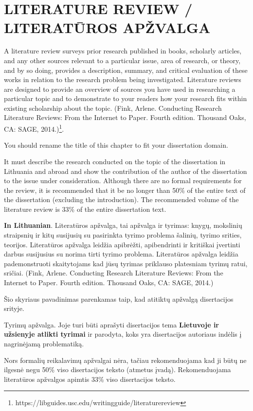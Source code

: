 
\setcounter{chapter}{0}

\chapter{\MakeUppercase{Literature review / Literatūros apžvalga}} %
\label{cha:review}


A literature review surveys prior research published in books, scholarly articles, and any other sources relevant to a particular issue, area of research, or theory, and by so doing, provides a description, summary, and critical evaluation of these works in relation to the research problem being investigated. Literature reviews are designed to provide an overview of sources you have used in researching a particular topic and to demonstrate to your readers how your research fits within existing scholarship about the topic.  (Fink, Arlene. Conducting Research Literature Reviews: From the Internet to Paper. Fourth edition. Thousand Oaks, CA: SAGE, 2014.)\footnote{https://libguides.usc.edu/writingguide/literaturereview}. 

You should rename the title of this chapter to fit your dissertation domain. 

It must describe the research conducted on the topic of the dissertation in Lithuania and abroad and show the contribution of the author of the dissertation to the issue under consideration.
Although there are no formal requirements for the review, it is recommended that it be no longer than 50\% of the entire text of the dissertation (excluding the introduction). The recommended volume of the literature review is 33\% of the entire dissertation text.

\textbf{In Lithuanian}. Literatūros apžvalga, tai apžvalga ir tyrimas: knygų, mokslinių straipsnių ir kitų susijusių su pasirinkta tyrimo problema šalinių, tyrimo srities, teorijos. 
Literatūros apžvalga leidžia apibrėžti, apibendrinti ir kritiškai įvertinti darbus susijusius su norima tirti tyrimo problema.
Literatūros apžvalga leidžia pademonstruoti skaitytojams kad jūsų tyrimas priklauso platesniam tyrimų ratui, sričiai. (Fink, Arlene. Conducting Research Literature Reviews: From the Internet to Paper. Fourth edition. Thousand Oaks, CA: SAGE, 2014.) 


Šio skyriaus pavadinimas parenkamas taip, kad atitiktų apžvalgą disertacijos srityje.

Tyrimų apžvalga. Joje turi būti aprašyti disertacijos tema \textbf{Lietuvoje ir užsienyje atlikti tyrimai} ir parodyta, koks yra disertacijos autoriaus indėlis į nagrinėjamą problematiką.

Nors formalių reikalavimų apžvalgai nėra, tačiau rekomenduojama kad ji būtų ne ilgesnė negu 50\% viso disertacijos teksto (atmetus įvadą). Rekomenduojama literatūros apžvalgos apimtis 33\% viso disertacijos teksto.